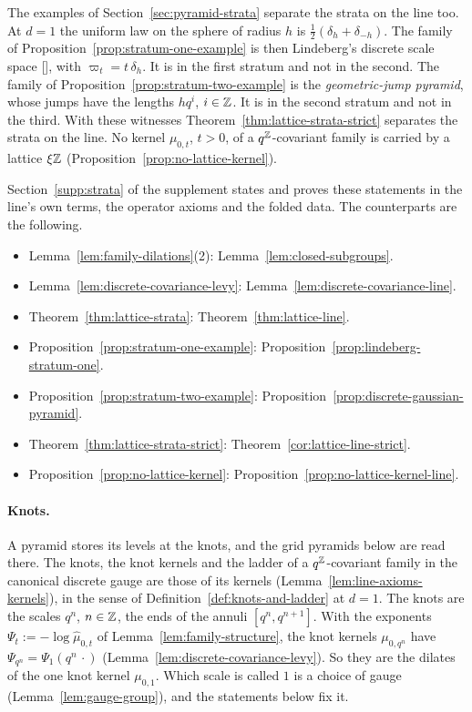 The examples of Section~\ref{sec:pyramid-strata} separate the strata on the line too. At $d = 1$
the uniform law on the sphere of radius $h$ is $\tfrac12(\delta_h + \delta_{-h})$. The family of
Proposition~\ref{prop:stratum-one-example} is then Lindeberg's discrete scale space
[], with $\varpi_t = t\,\delta_h$. It is in the first stratum and
not in the second. The family of Proposition~\ref{prop:stratum-two-example} is the
\emph{geometric-jump pyramid}, whose jumps have the lengths $hq^i$, $i \in \mathbb{Z}$. It is in the second
stratum and not in the third. With these witnesses
Theorem~\ref{thm:lattice-strata-strict} separates the strata on the line. No kernel $\mu_{0,t}$,
$t > 0$, of a $q^{\mathbb{Z}}$-covariant family is carried by a lattice $\xi\mathbb{Z}$
(Proposition~\ref{prop:no-lattice-kernel}).

Section~\ref{supp:strata} of the supplement states and proves these statements in the line's own
terms, the operator axioms and the folded data. The counterparts are the following.
\begin{itemize}
\item Lemma~\ref{lem:family-dilations}(2): Lemma~\ref{lem:closed-subgroups}.
\item Lemma~\ref{lem:discrete-covariance-levy}: Lemma~\ref{lem:discrete-covariance-line}.
\item Theorem~\ref{thm:lattice-strata}: Theorem~\ref{thm:lattice-line}.
\item Proposition~\ref{prop:stratum-one-example}: Proposition~\ref{prop:lindeberg-stratum-one}.
\item Proposition~\ref{prop:stratum-two-example}: Proposition~\ref{prop:discrete-gaussian-pyramid}.
\item Theorem~\ref{thm:lattice-strata-strict}: Theorem~\ref{cor:lattice-line-strict}.
\item Proposition~\ref{prop:no-lattice-kernel}: Proposition~\ref{prop:no-lattice-kernel-line}.
\end{itemize}

\paragraph{Knots.} A pyramid stores its levels at the knots, and the grid pyramids below are read
there. The knots, the knot kernels and the ladder of a $q^{\mathbb{Z}}$-covariant family in the canonical
discrete gauge are those of its kernels (Lemma~\ref{lem:line-axioms-kernels}), in the sense of
Definition~\ref{def:knots-and-ladder} at $d = 1$. The knots are the scales $q^n$, $n \in \mathbb{Z}$, the
ends of the annuli $[q^n, q^{n+1}]$. With the exponents $\Psi_t := -\log\widehat\mu_{0,t}$ of
Lemma~\ref{lem:family-structure}, the knot kernels $\mu_{0,q^n}$ have
$\Psi_{q^n} = \Psi_1(q^n\,\cdot)$ (Lemma~\ref{lem:discrete-covariance-levy}). So they are the
dilates of the one knot kernel $\mu_{0,1}$. Which scale is called $1$ is a choice of gauge
(Lemma~\ref{lem:gauge-group}), and the statements below fix it.

